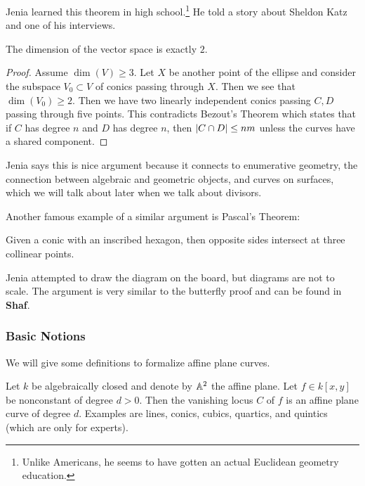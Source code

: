 \documentclass[twoside, 10pt]{article}
\newcommand{\shaf}{\textbf{Shaf}}
\begin{document}
    Jenia learned this theorem in high school.\footnote{Unlike Americans, he seems to have gotten an actual Euclidean geometry education.} He told a story about Sheldon Katz and one of his interviews.

    \begin{lem}
        The dimension of the vector space is exactly $2$.

        \begin{proof}
            Assume $\dim(V) \geq 3$. Let $X$ be another point of the ellipse and consider the subspace $V_0 \subset V$ of conics passing through $X$. Then we see that $\dim(V_0) \geq 2$. Then we have two linearly independent conics passing $C,D$ passing through five points. This contradicts Bezout's Theorem which states that if $C$ has degree $n$ and $D$ has degree $n$, then $\lvert C \cap D\rvert \leq nm$ unless the curves have a shared component.
        \end{proof}
    \end{lem}

    Jenia says this is nice argument because it connects to enumerative geometry, the connection between algebraic and geometric objects, and curves on surfaces, which we will talk about later when we talk about divisors.

    Another famous example of a similar argument is Pascal's Theorem:

    \begin{thm}[Pascal]
        Given a conic with an inscribed hexagon, then opposite sides intersect at three collinear points.
    \end{thm}

    Jenia attempted to draw the diagram on the board, but diagrams are not to scale. The argument is very similar to the butterfly proof and can be found in \shaf.

    \subsubsection{Basic Notions}

    We will give some definitions to formalize affine plane curves.
    
    \begin{defn}
        Let $k$ be algebraically closed and denote by $\mathbb{A}^2$ the affine plane. Let $f \in k[x,y]$ be nonconstant of degree $d>0$. Then the vanishing locus $C$ of $f$ is an affine plane curve of degree $d$. Examples are lines, conics, cubics, quartics, and quintics (which are only for experts).
    \end{defn}
\end{document}
